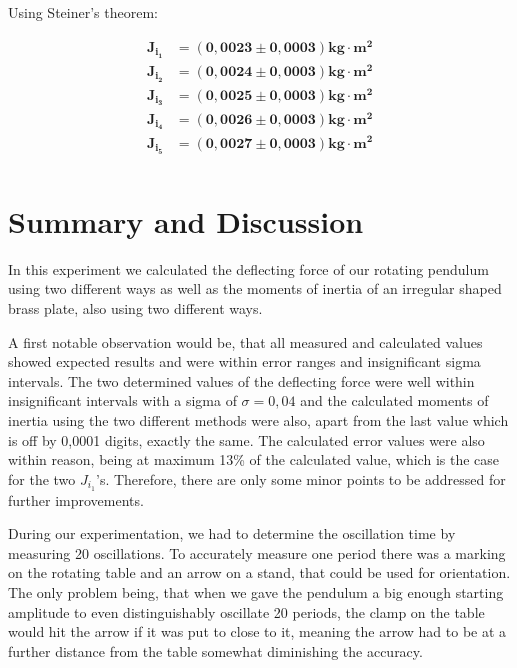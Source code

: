 \documentclass{article}
\begin{document}
Using Steiner's theorem:

\begin{equation}
    \begin{split}
        \bm{J_{i_1}} &= \bm{(0,0023 \pm 0,0003) \textbf{kg} \cdot \textbf{m}^2} \\
        \bm{J_{i_2}} &= \bm{(0,0024 \pm 0,0003) \textbf{kg} \cdot \textbf{m}^2} \\
        \bm{J_{i_3}} &= \bm{(0,0025 \pm 0,0003) \textbf{kg} \cdot \textbf{m}^2} \\
        \bm{J_{i_4}} &= \bm{(0,0026 \pm 0,0003) \textbf{kg} \cdot \textbf{m}^2} \\
        \bm{J_{i_5}} &= \bm{(0,0027 \pm 0,0003) \textbf{kg} \cdot \textbf{m}^2} \\
    \end{split}
\end{equation}

\newpage

\section{Summary and Discussion}

In this experiment we calculated the deflecting force of our rotating pendulum using two different ways as well as the moments of inertia of an irregular shaped brass plate, also using two different ways.

A first notable observation would be, that all measured and calculated values showed expected results and were within error ranges and insignificant sigma intervals. The two determined values of the deflecting force were well within insignificant intervals with a sigma of $\sigma = 0,04$ and the calculated moments of inertia using the two different methods were also, apart from the last value which is off by 0,0001 digits, exactly the same. The calculated error values were also within reason, being at maximum 13\% of the calculated value, which is the case for the two $J_{i_1}$'s. Therefore, there are only some minor points to be addressed for further improvements.

During our experimentation, we had to determine the oscillation time by measuring 20 oscillations. To accurately measure one period there was a marking on the rotating table and an arrow on a stand, that could be used for orientation. The only problem being, that when we gave the pendulum a big enough starting amplitude to even distinguishably oscillate 20 periods, the clamp on the table would hit the arrow if it was put to close to it, meaning the arrow had to be at a further distance from the table somewhat diminishing the accuracy. 
\end{document}
